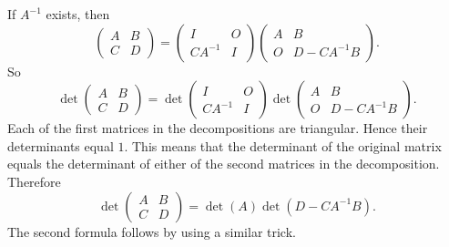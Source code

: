\documentclass[12pt]{article}
\begin{document}
If $A^{-1}$ exists, then  
$$\begin{pmatrix} A & B \\ C & D \end{pmatrix}
=\begin{pmatrix} I & O \\ CA^{-1} & I \end{pmatrix}\begin{pmatrix} A & B \\ O & D-CA^{-1}B \end{pmatrix}.$$ So  $$\det \begin{pmatrix} A & B \\ C & D \end{pmatrix}
=\det \begin{pmatrix} I & O \\ CA^{-1} & I \end{pmatrix}\det \begin{pmatrix} A & B \\ O & D-CA^{-1}B \end{pmatrix}. $$
Each of the first matrices in the decompositions are triangular.  Hence their determinants equal $1$.  This means that the determinant of the original matrix equals the determinant of either of the second matrices in the decomposition. Therefore $$\det \begin{pmatrix} A & B \\ C & D \end{pmatrix} =\det(A)\det(D-CA^{-1}B).$$
The second formula follows by using a similar trick.
\end{document}
